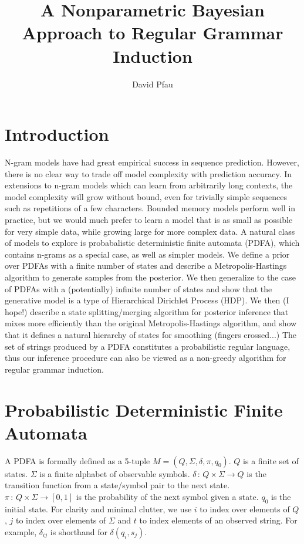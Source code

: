\documentclass[11pt]{article}
\title{A Nonparametric Bayesian Approach to Regular Grammar Induction}
\author{David Pfau}
\begin{document}
\maketitle
\section{Introduction}
N-gram models have had great empirical success in sequence prediction.  However, there is no clear way to trade off model complexity with prediction accuracy.  In extensions to n-gram models which can learn from arbitrarily long contexts, the model complexity will grow without bound, even for trivially simple sequences such as repetitions of a few characters.  Bounded memory models perform well in practice, but we would much prefer to learn a model that is as small as possible for very simple data, while growing large for more complex data.  A natural class of models to explore is probabalistic deterministic finite automata (PDFA), which contains n-grams as a special case, as well as simpler models.  We define a prior over PDFAs with a finite number of states and describe a Metropolis-Hastings algorithm to generate samples from the posterior.  We then generalize to the case of PDFAs with a (potentially) infinite number of states and show that the generative model is a type of Hierarchical Dirichlet Process (HDP).  We then (I hope!) describe a state splitting/merging algorithm for posterior inference that mixes more efficiently than the original Metropolis-Hastings algorithm, and show that it defines a natural hierarchy of states for smoothing (fingers crossed...)  The set of strings produced by a PDFA constitutes a probabilistic regular language, thus our inference procedure can also be viewed as a non-greedy algorithm for regular grammar induction.

\section{Probabilistic Deterministic Finite Automata}
A PDFA is formally defined as a 5-tuple $M = (Q,\Sigma,\delta,\pi,q_0)$.  $Q$ is a finite set of states. $\Sigma$ is a finite alphabet of observable symbols. $\delta\,:\,Q\times\Sigma\rightarrow Q$ is the transition function from a state/symbol pair to the next state.  $\pi\,:\,Q\times\Sigma\rightarrow[0,1]$ is the probability of the next symbol given a state.  $q_0$ is the initial state.  For clarity and minimal clutter, we use $i$ to index over elements of $Q$, $j$ to index over elements of $\Sigma$ and $t$ to index elements of an observed string.  For example, $\delta_{ij}$ is shorthand for $\delta(q_i,s_j)$.
\end{document}
